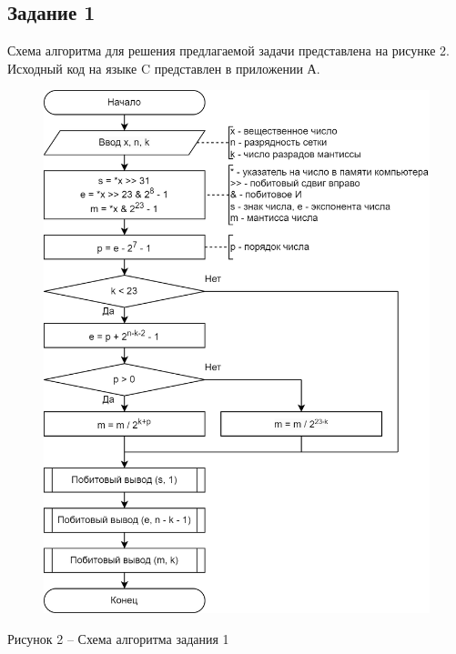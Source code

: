 \documentclass[a4paper,14pt]{extarticle}
\begin{document}
	\pagebreak
	\subsection*{Задание 1}
	Схема алгоритма для решения предлагаемой задачи представлена на рисунке 2. Исходный код на языке C представлен в приложении А.
	\begin{figure}[h]
		\centering
		\includegraphics[width=0.65\linewidth]{schemes/s-1}
	\end{figure}
	\begin{center}
		Рисунок 2 – Схема алгоритма задания 1
	\end{center}
	
	\pagebreak
\end{document}
